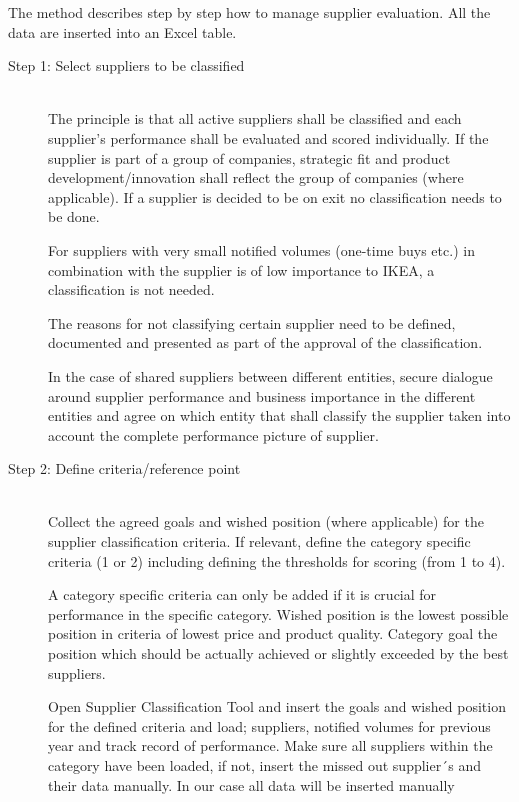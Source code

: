 \documentclass[oneside,12pt]{article}%
\begin{document}
The method describes step by step how to manage supplier evaluation. All the data are inserted into an Excel table.


\begin{description}
  \item[Step 1: Select suppliers to be classified] \hfill \\
  The principle is that all active suppliers shall be classified and each supplier’s performance shall be evaluated and scored individually. If the supplier is part of a group of companies, strategic fit and product development/innovation shall reflect the group of companies (where applicable). If a supplier is decided to be on exit no classification needs to be done. \par
  For suppliers with very small notified volumes (one-time buys etc.) in combination with the supplier is of low importance to IKEA, a classification is not needed. \par
  The reasons for not classifying certain supplier need to be defined, documented and presented as part of the approval of the classification. \par
  In the case of shared suppliers between different entities, secure dialogue around supplier performance and business importance in the different entities and agree on which entity that shall classify the supplier taken into account the complete performance picture of supplier.


  \item[Step 2: Define criteria/reference point] \hfill \\
  Collect the agreed goals and wished position (where applicable) for the supplier classification criteria. If relevant, define the category specific criteria (1 or 2) including defining the thresholds for scoring (from 1 to 4).\par
  A category specific criteria can only be added if it is crucial for performance in the specific category. \apr
  Wished position is the lowest possible position in criteria of lowest price and product quality. Category goal the position which should be actually achieved or slightly exceeded by the best suppliers.\par
  Open Supplier Classification Tool and insert the goals and wished position for the defined criteria and load; suppliers, notified volumes for previous year and track record of performance. Make sure all suppliers within the category have been loaded, if not, insert the missed out supplier´s and their data manually. In our case all data will be inserted manually


\end{description}
\end{document}
